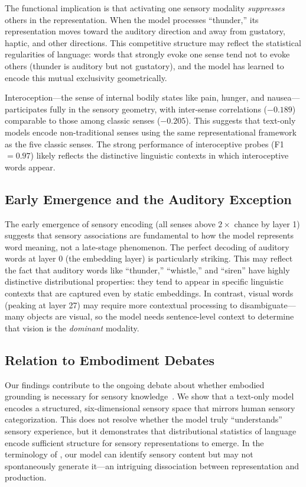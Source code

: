 The functional implication is that activating one sensory modality \emph{suppresses} others in the representation. When the model processes ``thunder,'' its representation moves toward the auditory direction and away from gustatory, haptic, and other directions. This competitive structure may reflect the statistical regularities of language: words that strongly evoke one sense tend not to evoke others (thunder is auditory but not gustatory), and the model has learned to encode this mutual exclusivity geometrically.

Interoception---the sense of internal bodily states like pain, hunger, and nausea---participates fully in the sensory geometry, with inter-sense correlations ($-0.189$) comparable to those among classic senses ($-0.205$). This suggests that text-only models encode non-traditional senses using the same representational framework as the five classic senses. The strong performance of interoceptive probes (F1 $= 0.97$) likely reflects the distinctive linguistic contexts in which interoceptive words appear.

\subsection{Early Emergence and the Auditory Exception}

The early emergence of sensory encoding (all senses above $2\times$ chance by layer 1) suggests that sensory associations are fundamental to how the model represents word meaning, not a late-stage phenomenon. The perfect decoding of auditory words at layer 0 (the embedding layer) is particularly striking. This may reflect the fact that auditory words like ``thunder,'' ``whistle,'' and ``siren'' have highly distinctive distributional properties: they tend to appear in specific linguistic contexts that are captured even by static embeddings. In contrast, visual words (peaking at layer 27) may require more contextual processing to disambiguate---many objects are visual, so the model needs sentence-level context to determine that vision is the \emph{dominant} modality.

\subsection{Relation to Embodiment Debates}

Our findings contribute to the ongoing debate about whether embodied grounding is necessary for sensory knowledge~\citep{xu2025large, lee2024language}. We show that a text-only model encodes a structured, six-dimensional sensory space that mirrors human sensory categorization. This does not resolve whether the model truly ``understands'' sensory experience, but it demonstrates that distributional statistics of language encode sufficient structure for sensory representations to emerge. In the terminology of \citet{hicke2025zero}, our model can identify sensory content but may not spontaneously generate it---an intriguing dissociation between representation and production.

